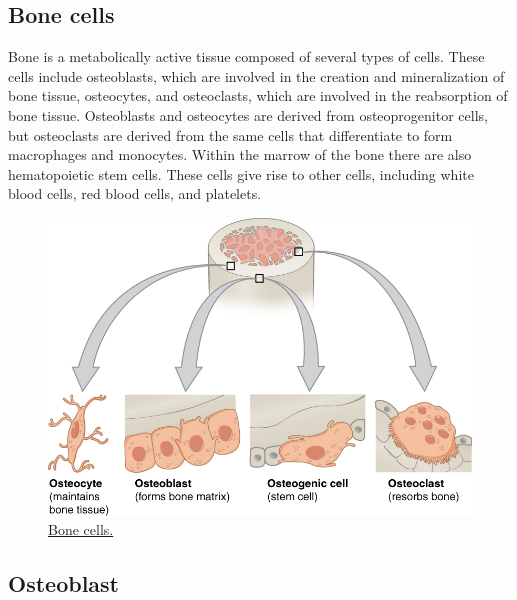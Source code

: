 \hypertarget{bone-cells}{%
\subsection{Bone cells}\label{bone-cells}}

Bone is a metabolically active tissue composed of several types of cells. These cells include osteoblasts, which are involved in the creation and mineralization of bone tissue, osteocytes, and osteoclasts, which are involved in the reabsorption of bone tissue. Osteoblasts and osteocytes are derived from osteoprogenitor cells, but osteoclasts are derived from the same cells that differentiate to form macrophages and monocytes. Within the marrow of the bone there are also hematopoietic stem cells. These cells give rise to other cells, including white blood cells, red blood cells, and platelets.



\begin{figure}

{\centering \includegraphics[width=0.7\linewidth]{./figures/locomotion/604_Bone_cells} 

}

\caption{\href{https://commons.wikimedia.org/wiki/File:604_Bone_cells.jpg}{Bone cells.}}\label{fig:bonecells}
\end{figure}

\hypertarget{osteoblast}{%
\subsection{Osteoblast}\label{osteoblast}}

